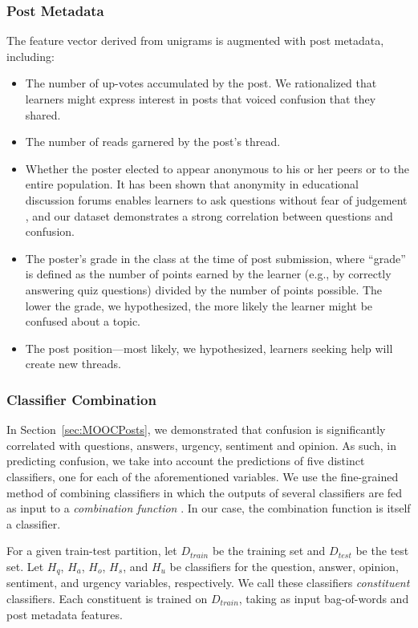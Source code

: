 \documentclass{edm_template}
\newcommand{\squishlist}{
 \begin{list}{$\bullet$}
 {
  \setlength{\itemsep}{0pt}
  \setlength{\parsep}{3pt}
  \setlength{\topsep}{3pt}
  \setlength{\partopsep}{0pt}
  \setlength{\leftmargin}{1.5em}
  \setlength{\labelwidth}{1em}
  \setlength{\labelsep}{0.5em} } }
\newcommand{\squishend}{
  \end{list}  }
\begin{document}
\subsubsection{Post Metadata}
The feature vector derived from unigrams is augmented with post metadata, including: 
\vspace{-15pt}
\begin{itemize}
\setlength\itemsep{0.05em}
       \item The number of up-votes accumulated by the post. We rationalized that learners might express interest in posts that voiced confusion that they shared. 
       \item The number of reads garnered by the post's thread.
       \item Whether the poster elected to appear anonymous to his or her peers or to the entire population. It has been shown that anonymity in educational discussion forums enables learners to ask questions without fear of judgement \cite{freeman2004student}, and our dataset demonstrates a strong correlation between questions and confusion.
       \item The poster's grade in the class at the time of post submission, where ``grade'' is defined as the number of points earned by the learner (e.g., by correctly answering quiz questions) divided by the number of points possible. The lower the grade, we hypothesized, the more likely the learner might be confused about a topic.
       \item The post position---most likely, we hypothesized, learners seeking help will create new threads.
\end{itemize}

\vspace{-0.3cm}
\subsubsection{Classifier Combination}
In Section~\ref{sec:MOOCPosts}, we demonstrated that confusion is significantly correlated with questions, answers, urgency, sentiment and opinion. As such, in predicting confusion, we take into account the predictions of five distinct classifiers, one for each of the aforementioned variables. We use the fine-grained method of combining classifiers in which the outputs of several classifiers are fed as input to a \emph{combination function} \cite{bennett2005combination}. In our case, the combination function is itself a classifier.

For a given train-test partition, let $D_{train}$ be the training set and $D_{test}$ be the test set. Let $H_{q}$, $H_{a}$, $H_{o}$, $H_{s}$, and $H_{u}$ be classifiers for the question, answer, opinion, sentiment, and urgency variables, respectively. We call these classifiers \emph{constituent} classifiers. Each constituent is trained on $D_{train}$, taking as input bag-of-words and post metadata features.
\end{document}
